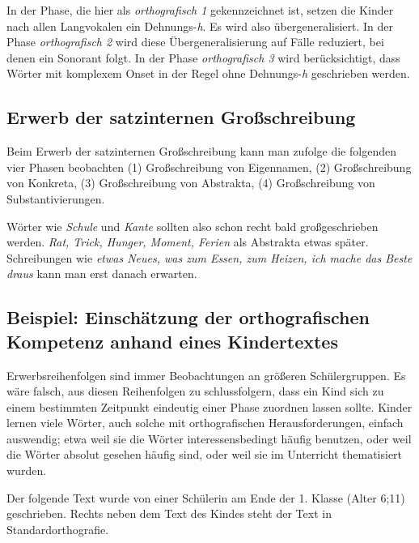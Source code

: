 In der Phase, die hier als \textit{orthografisch 1} gekennzeichnet ist, setzen die Kinder nach allen Langvokalen ein Dehnungs-\textit{h}. Es wird also übergeneralisiert. In der Phase \textit{orthografisch 2} wird diese Übergeneralisierung auf Fälle reduziert, bei denen ein Sonorant folgt. In der Phase \textit{orthografisch 3} wird berücksichtigt, dass Wörter mit komplexem Onset in der Regel ohne Dehnungs-\textit{h} geschrieben werden. 

\subsection{Erwerb der satzinternen Großschreibung}
Beim Erwerb der satzinternen Großschreibung kann man \citet{Bredel2006} zufolge die folgenden vier Phasen beobachten (1) Großschreibung von Eigennamen, (2) Großschreibung von Konkreta, (3) Großschreibung von Abstrakta, (4) Großschreibung von Substantivierungen.

Wörter wie \textit{Schule} und \textit{Kante} sollten also schon recht bald großgeschrieben werden. \textit{Rat, Trick, Hunger, Moment, Ferien} als Abstrakta etwas später. Schreibungen wie \textit{etwas Neues, was zum Essen, zum Heizen, ich mache das Beste draus} kann man erst danach erwarten. 

\subsection{Beispiel: Einschätzung der orthografischen Kompetenz anhand eines Kindertextes}

Erwerbsreihenfolgen sind immer Beobachtungen an größeren Schülergruppen. Es wäre falsch, aus diesen Reihenfolgen zu schlussfolgern, dass ein Kind sich zu einem bestimmten Zeitpunkt eindeutig einer Phase zuordnen lassen sollte. Kinder lernen viele Wörter, auch solche mit orthografischen Herausforderungen, einfach auswendig; etwa weil sie die Wörter interessensbedingt häufig benutzen, oder weil die Wörter absolut gesehen häufig sind, oder weil sie im Unterricht thematisiert wurden.

Der folgende Text wurde von einer Schülerin am Ende der 1. Klasse (Alter 6;11) geschrieben. Rechts neben dem Text des Kindes steht der Text in Standardorthografie.



